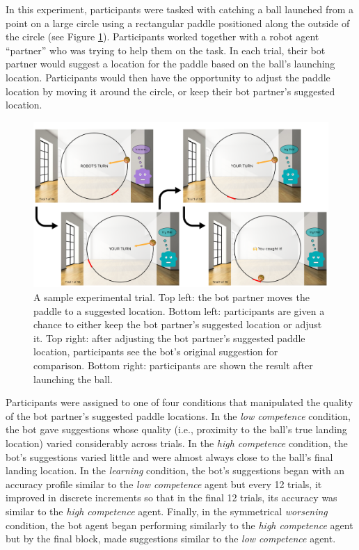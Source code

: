 \documentclass[10pt,letterpaper]{article}
\begin{document}
In this experiment, participants were tasked with catching a ball launched from a point on a large circle using a rectangular paddle positioned along the outside of the circle (see Figure \ref{fig:stim}).\footnotemark{} Participants worked together with a robot agent ``partner'' who was trying to help them on the task. In each trial, their bot partner would suggest a location for the paddle based on the ball's launching location. Participants would then have the opportunity to adjust the paddle location by moving it around the circle, or keep their bot partner's suggested location. 



\begin{figure}[H]
\begin{center}
\includegraphics[width=\linewidth]{img/stimulus_overview.png}
\end{center}
\caption{A sample experimental trial. Top left: the bot partner moves the paddle to a suggested location. Bottom left: participants are given a chance to either keep the bot partner's suggested location or adjust it. Top right: after adjusting the bot partner's suggested paddle location, participants see the bot's original suggestion for comparison. Bottom right: participants are shown the result after launching the ball.} 
\label{fig:stim}
\end{figure}


Participants were assigned to one of four conditions that manipulated the quality of the bot partner's suggested paddle locations. In the \textit{low competence} condition, the bot gave suggestions whose quality (i.e., proximity to the ball's true landing location) varied considerably across trials. In the \textit{high competence} condition, the bot's suggestions varied little and were almost always close to the ball's final landing location. In the \textit{learning} condition, the bot's suggestions began with an accuracy profile similar to the \textit{low competence} agent but every 12 trials, it improved in discrete increments so that in the final 12 trials, its accuracy was similar to the \textit{high competence} agent. Finally, in the symmetrical \textit{worsening} condition, the bot agent began performing similarly to the \textit{high competence} agent but by the final block, made suggestions similar to the \textit{low competence} agent.
\end{document}
